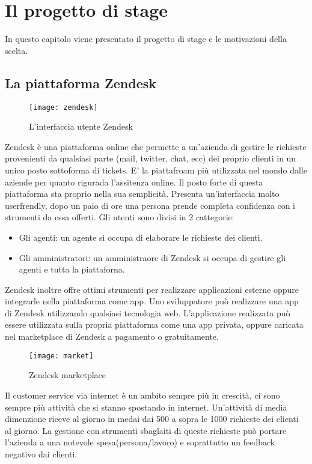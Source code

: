 
\chapter{Il progetto di stage}
In questo capitolo viene presentato il progetto di stage e le motivazioni della scelta.
\section{La piattaforma Zendesk}
\begin{figure}[!h] 
	\centering 
	\texttt{[image: zendesk]} 
	\caption{L'interfaccia utente Zendesk}
\end{figure}
Zendesk è una piattaforma online che permette a un'azienda di gestire le richieste provenienti da qualsiasi parte (mail, twitter, chat, ecc) dei proprio clienti in un unico posto sottoforma di tickets. E' la piattafroam più utilizzata nel mondo dalle aziende per quanto rigurada l'assitenza online. Il posto forte di questa piattaforma sta proprio nella sua semplicità. Presenta un'interfaccia molto userfrendly, dopo un paio di ore una persona prende completa confidenza con i strumenti da essa offerti. Gli utenti sono divisi in 2 cattegorie:
	\begin{itemize}
		\item Gli agenti: un agente si occupa di elaborare le richieste dei clienti. 
		\item Gli amministratori: un amministraore di Zendesk si occupa di gestire gli agenti e tutta la piattaforna. 
	\end{itemize}
\newpage
Zendesk inoltre offre ottimi strumenti per realizzare applicazioni esterne oppure integrarle nella piattaforma come app. Uno sviluppatore può realizzare una app di Zendesk utilizzando qualsiasi tecnologia web. L'applicazione realizzata può essere utilizzata sulla propria piattaforma come una app privata, oppure caricata nel marketplace di Zendesk a pagamento o gratuitamente.  
 
\begin{figure}[!h] 
	\centering 
	\texttt{[image: market]} 
	\caption{Zendesk marketplace}
	\end{figure}

Il customer service via internet è un ambito sempre più in crescità, ci sono sempre più attività che si stanno spostando in internet. Un'attività di media dimenzione riceve al giorno in medai dai 500 a sopra le 1000 richieste dei clienti al giorno. La gestione con strumenti sbaglaiti di queste richieste può portare l'azienda a una notevole spesa(persona/lavoro) e soprattutto un feedback negativo dai clienti. 
